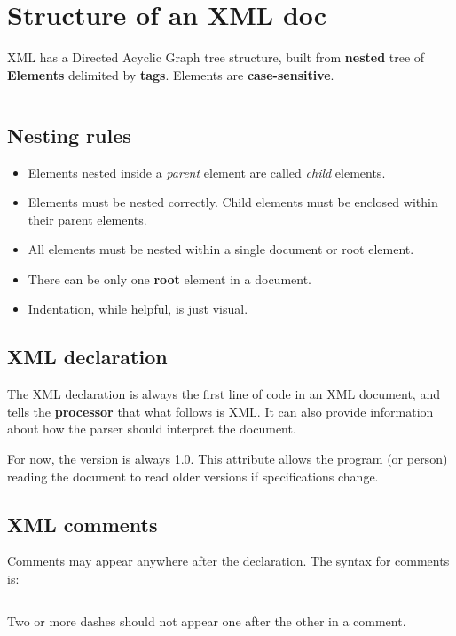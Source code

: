 \documentclass{pgnotes}
\begin{document}
\section{Structure of an XML doc}

XML has a Directed Acyclic Graph tree structure, built from \textbf{nested} tree of \textbf{Elements} delimited by \textbf{tags}.
Elements are \textbf{case-sensitive}.

\inputminted{xml}{closed.xml}

\subsection{Nesting rules} 

\begin{itemize}
\item Elements nested inside a \textit{parent} element are called \textit{child} elements. 
\item Elements must be nested correctly. Child elements must be enclosed within their parent elements.
\item All elements must be nested within a single document or root element.
\item There can be only one \textbf{root} element in a document.
\item Indentation, while helpful, is just visual.  
\end{itemize}


\subsection{XML declaration}

The XML declaration is always the first line of code in an XML document, and tells the \textbf{processor} that what follows is XML.
It can also provide information about how the parser should interpret the document.

For now, the version is always 1.0.
This attribute allows the program (or person) reading the document to read older versions if specifications change. 


\subsection{XML comments}

Comments may appear anywhere after the declaration.
The syntax for comments is:

\inputminted{xml}{comment.xml}

Two or more dashes should not appear one after the other in a comment.
\end{document}
